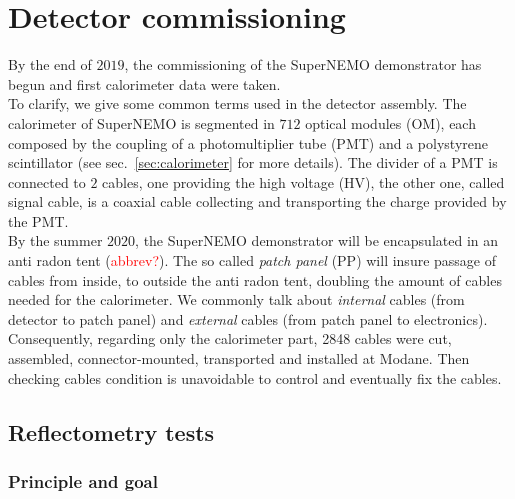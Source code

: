 \chapter{Detector commissioning}
\label{sec:commissioning}

By the end of $2019$, the commissioning of the SuperNEMO demonstrator has begun and first calorimeter data were taken.\\
To clarify, we give some common terms used in the detector assembly.
The calorimeter of SuperNEMO is segmented in $712$ optical modules (OM), each composed by the coupling of a photomultiplier tube (PMT) and a polystyrene scintillator (see sec.~\ref{sec:calorimeter} for more details).
The divider of a PMT is connected to $2$ cables, one providing the high voltage (HV), the other one, called signal cable, is a coaxial cable collecting and transporting the charge provided by the PMT.\\
By the summer $2020$, the SuperNEMO demonstrator will be encapsulated in an anti radon tent (\textcolor{red}{abbrev?}).
The so called \emph{patch panel} (PP) will insure passage of cables from inside, to outside the anti radon tent, doubling the amount of cables needed for the calorimeter.
We commonly talk about \emph{internal} cables (from detector to patch panel) and \emph{external} cables (from patch panel to electronics).
Consequently, regarding only the calorimeter part, 2848 cables were cut, assembled, connector-mounted, transported and installed at Modane.
Then checking cables condition is unavoidable to control and eventually fix the cables.

\section{Reflectometry tests}
\label{sec:reflecto}

\subsection{Principle and goal}

